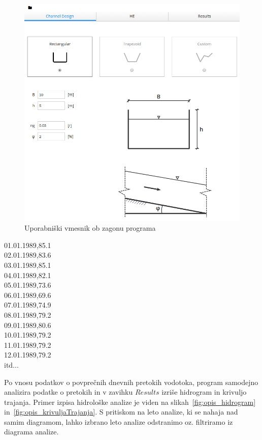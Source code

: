 \begin{figure}[htp!]
	\begin{centering}
		\includegraphics[width=\textwidth]{slike/opis/frontpage.png}\caption{Uporabniški vmesnik ob zagonu programa}\label{fig:opis_frontpage}
	\end{centering}
\end{figure}

\begin{center}
01.01.1989,85.1\\
02.01.1989,83.6\\
03.01.1989,85.1\\
04.01.1989,82.1\\
05.01.1989,73.6\\
06.01.1989,69.6\\
07.01.1989,74.9\\
08.01.1989,79.2\\
09.01.1989,80.6\\
10.01.1989,79.2\\
11.01.1989,79.2\\
12.01.1989,79.2\\
itd...\\
\end{center}

Po vnosu podatkov o povprečnih dnevnih pretokih vodotoka, program samodejno analizira podatke o pretokih in v zavihku $Results$ izriše hidrogram in krivuljo trajanja. Primer izpisa hidrološke analize je viden na slikah~\ref{fig:opis_hidrogram} in~\ref{fig:opis_krivuljaTrajanja}. S pritiskom na leto analize, ki se nahaja nad samim diagramom, lahko izbrano leto analize odstranimo oz. filtriramo iz diagrama analize.


